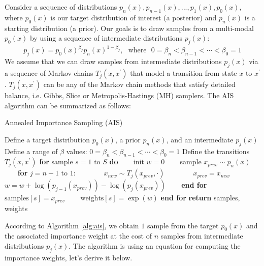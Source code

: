 Consider a sequence of distributions $p_n(x), p_{n-1}(x),...,p_1(x), p_0(x)$, where $p_0(x)$ is our target distribution of interest (a posterior) and $p_n(x)$ is a starting distribution (a prior). Our goals is to draw samples from a multi-modal $p_0(x)$ by using a sequence of intermediate distributions $p_j(x)$:
\begin{equation}
    p_j(x) = p_0(x)^{\beta_j}p_n(x)^{1-\beta_j},~~~\mathrm{where}~~~ 0 = \beta_n < \beta_{n-1} < \cdots < \beta_{0} = 1
\end{equation}
We assume that we can draw samples from intermediate distributions $p_j(x)$ via a sequence of Markov chains $T_j(x, x^{\prime})$ that model a transition from state $x$ to $x^{\prime}$. $T_j(x, x^{\prime})$ can be any of the Markov chain methods that satisfy detailed balance, i.e. Gibbs, Slice or Metropolis-Hastings (MH) samplers. The AIS algorithm can be summarized as follows:

\begin{algorithm}
\caption{Annealed Importance Sampling (AIS) \cite{Neal1998}}
\label{alg:ais}
\begin{algorithmic}[1]
\STATE Define a target distribution $p_0(x)$, a prior $p_n(x)$, and an intermediate $p_j(x)$ 
\STATE Define a range of $\beta$ values: $0 = \beta_n < \beta_{n-1} < \cdots < \beta_{0} = 1$
\STATE Define the transitions $T_j(x,x^{\prime})$ 
\STATE \textbf{for} sample $s = 1$ to $S$ \textbf{do} 
\STATE ~~~ init $w = 0$
\STATE ~~~ sample $x_{prev} \sim p_n(x)$
\STATE ~~~ \textbf{for} $j=n-1$ to $1$:
\STATE ~~~ ~~~ $x_{new} \sim T_j(x_{prev}, \cdot)$ 
\STATE ~~~ ~~~ $x_{prev} = x_{new}$
\STATE ~~~ ~~~ $w = w + \log(p_{j-1}(x_{prev})) - \log(p_{j}(x_{prev}))$
\STATE ~~~ \textbf{end for}
\STATE ~~~ $\mathrm{samples}[s] = x_{prev}$
\STATE ~~~ $\mathrm{weights}[s] = \exp(w)$
\STATE \textbf{end for}
\STATE \textbf{return} samples, weights
\end{algorithmic}
\end{algorithm}
According to Algorithm \ref{alg:ais}, we obtain $1$ sample from the target $p_0(x)$ and the associated importance weight at the cost of $n$ samples from intermediate distributions $p_j(x)$. The algorithm is using an equation for computing the importance weights, let's derive it below.\\

